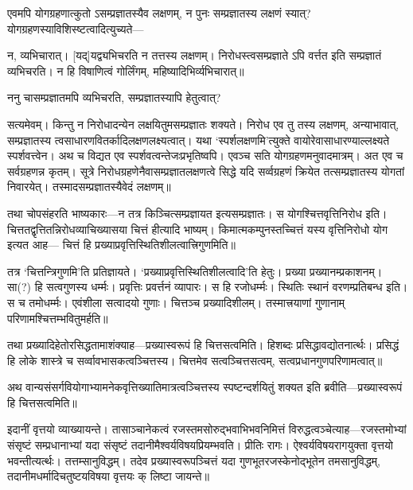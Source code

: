 एवमपि योगग्रहणात्कुतो ऽसम्प्रज्ञातस्यैव लक्षणम्, न पुनः सम्प्रज्ञातस्य लक्षणं स्यात्? योगग्रहणस्याविशिस्ष्टत्वादित्युच्यते---

न, व्यभिचारात्। [यद्]यद्व्यभिचरति न तत्तस्य लक्षणम्। निरोधस्त्वसम्प्रज्ञाते ऽपि वर्त्तत इति सम्प्रज्ञातं व्यभिचरति। न 
हि विषाणित्वं गोर्लिंगम्, महिष्यादिभिर्व्यभिचारात्॥

ननु चासम्प्रज्ञातमपि व्यभिचरति, सम्प्रज्ञातस्यापि हेतुत्वात्?

सत्यमेवम्। किन्तु न निरोधादन्येन लक्षयितुमसम्प्रज्ञातः शक्यते। निरोध एव तु तस्य लक्षणम्, अन्याभावात्, सम्प्रज्ञातस्य त्वसाधारणवितर्कादिलक्षणलक्ष्यत्वात्। यथा `स्पर्शलक्षणमि'त्युक्ते वायोरेवासाधारण्याल्लक्ष्यते स्पर्शवत्त्वेन। अथ च विद्यत एव स्पर्शवत्वन्तेजःप्रभृतिष्वपि। एवञ्च सति योगग्रहणमनुवादमात्रम्। अत एव च सर्वग्रहणन्न कृतम्। सूत्रे निरोधग्रहणेनैवासम्प्रज्ञातलक्षणत्वे सिद्धे यदि सर्व्वग्रहणं क्रियेत तत्सम्प्रज्ञातस्य योगतां निवारयेत्। तस्मादसम्प्रज्ञातस्यैवेदं लक्षणम्॥

तथा चोपसंहरति भाष्यकारः---न तत्र किञ्चित्सम्प्रज्ञायत इत्यसम्प्रज्ञातः। स योगश्चित्तवृत्तिनिरोध इति। 
चित्ततद्वृत्तितन्निरोधव्याचिख्यासया चित्तं हीत्यादि भाष्यम्। किमात्मकम्पुनस्तच्चित्तं यस्य वृत्तिनिरोधो योग इत्यत आह---
चित्तं हि प्रख्याप्रवृत्तिस्थितिशीलत्वात्त्रिगुणमिति॥

तत्र `चित्तन्त्रिगुणमि'ति प्रतिज्ञायते। `प्रख्याप्रवृत्तिस्थितिशीलत्वादि'ति हेतुः। प्रख्या प्रख्यानम्प्रकाशनम्। सा(?) हि 
सत्वगुणस्य धर्म्मः। प्रवृत्तिः प्रवर्त्तनं व्यापारः। स हि रजोधर्म्मः। स्थितिः स्थानं वरणम्प्रतिबन्ध इति। स च तमोधर्म्मः। 
एवंशीला सत्वादयो गुणाः। चित्तञ्च प्रख्यादिशीलम्। तस्मात्त्रयाणां गुणानाम् परिणामश्चित्तम्भवितुमर्हति॥ %

तथा प्रख्यादिहेतोरसिद्धतामाशंक्याह---प्रख्यास्वरूपं हि चित्तसत्वमिति। हिशब्दः प्रसिद्धावद्योतनार्त्थः। प्रसिद्धं हि लोके 
शास्त्रे च सर्व्वावभासकत्वञ्चित्तस्य। चित्तमेव सत्वञ्चित्तसत्वम्, सत्वप्रधानगुणपरिणामत्वात्॥ %

अथ वान्यसंसर्गवियोगाभ्यामनेकवृत्तिख्यातिमात्रत्वञ्चित्तस्य स्पष्टन्दर्शयितुं शक्यत इति ब्रवीति---प्रख्यास्वरूपं हि 
चित्तसत्वमिति॥

इदानीं वृत्तयो व्याख्यायन्ते। तासाञ्चानेकत्वं रजस्तमसोरुद्भवाभिभवनिमित्तं विरुद्धत्वञ्चेत्याह---रजस्तमोभ्यां संसृष्टं 
सम्प्रधानाभ्यां यदा संसृष्टं तदानीमैश्वर्यविषयप्रियम्भवति। प्रीतिः रागः। ऐश्वर्यविषयरागयुक्ता वृत्तयो भवन्तीत्यर्त्थः। 
तत्तम्सानुविद्धम्। तदेव प्रख्यास्वरूपञ्चित्तं यदा गुणभूतरजस्केनोद्भूतेन तमसानुविद्धम्, तदानीमधर्मादिचतुष्टयविषया वृत्तयः क्
लिष्टा जायन्ते॥

